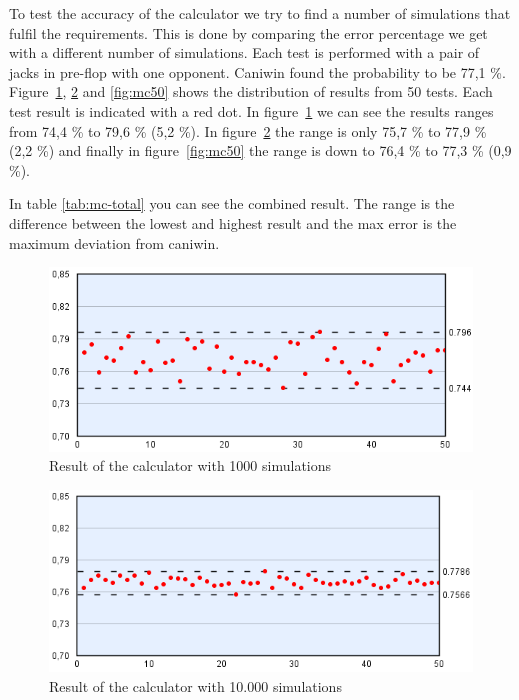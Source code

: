 To test the accuracy of the calculator we try to find a number of simulations that fulfil the requirements. This is done by comparing the error percentage we get with a different number of simulations. Each test is performed with a pair of jacks in pre-flop with one opponent. Caniwin found the probability to be 77,1 \%. Figure~\ref{fig:mc1}, \ref{fig:mc10} and \ref{fig:mc50} shows the distribution of results from 50 tests. Each test result is indicated with a red dot. In figure~\ref{fig:mc1} we can see the results ranges from 74,4 \% to 79,6 \% (5,2 \%). In figure~\ref{fig:mc10} the range is only 75,7 \% to 77,9 \% (2,2 \%) and finally in figure~\ref{fig:mc50} the range is down to 76,4 \% to 77,3 \% (0,9 \%).

In table \ref{tab:mc-total} you can see the combined result. The range is the difference between the lowest and highest result and the max error is the maximum deviation from caniwin.



\begin{figure}[H]
  \center
    \includegraphics[scale=0.775]{images/MonteCarlo/1k.png}
  \caption{Result of the calculator with 1000 simulations \label{fig:mc1}}
\end{figure}

\begin{figure}[H]
  \center
    \includegraphics[scale=0.775]{images/MonteCarlo/10k.png}
  \caption{Result of the calculator with 10.000 simulations \label{fig:mc10}}
\end{figure}

